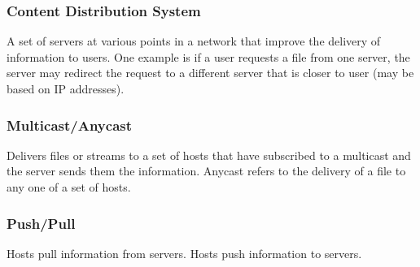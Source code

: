 \subsubsection*{Content Distribution System}
A set of servers at various points in a network that improve the delivery of information to users. One example is if a user requests a file from one server, the server may redirect the request to a different server that is closer to user (may be based on IP addresses).
\subsubsection*{Multicast/Anycast}
Delivers files or streams to a set of hosts that have subscribed to a multicast and the server sends them the information. 
Anycast refers to the delivery of a file to any one of a set of hosts.
\subsubsection*{Push/Pull}
Hosts pull information from servers. Hosts push information to servers. 